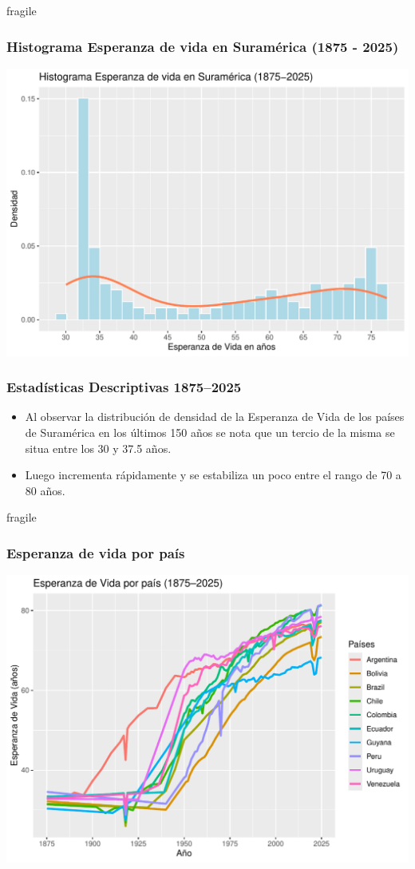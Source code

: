 \documentclass{beamer}
\begin{document}
\begin{frame}{fragile}
\frametitle{Histograma Esperanza de vida en Suramérica (1875 - 2025)}

\includegraphics{presentacion_Parada_G_M8R2-002}

\end{frame}

\begin{frame}[fragile]
\frametitle{Estadísticas Descriptivas 1875–2025}

\begin{itemize}
\item<1> Al observar la distribución de densidad de la Esperanza de Vida de los países de Suramérica en los últimos 150 años se nota que un tercio de la misma se situa entre los 30 y 37.5 años.

\item<2> Luego incrementa rápidamente y se estabiliza un poco entre el rango de 70 a 80 años.

\end{itemize}
\end{frame}


\begin{frame}{fragile}
\frametitle{Esperanza de vida por país}

\includegraphics{presentacion_Parada_G_M8R2-003}

\end{frame}
\end{document}
